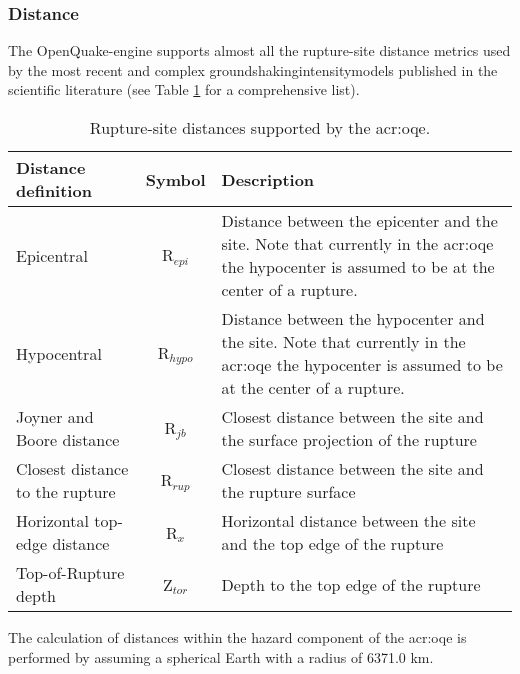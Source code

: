 \subsubsection{Distance}
%
The OpenQuake-engine supports almost all the rupture-site 
distance metrics used by the most recent and complex 
\glspl{groundshakingintensitymodel} published in the scientific 
literature (see Table \ref{tab:distances} for a comprehensive list).
\begin{table}[!t]
\centering
\caption{Rupture-site distances supported by the \gls{acr:oqe}.}
\begin{tabular}{|p{4.5cm}cp{7.5cm}|}
\hline
\rowcolor{anti-flashwhite}
\bf{Distance definition} & \bf{Symbol} & \bf{Description} \\
\hline 
Epicentral & R$_{epi}$ & Distance between the epicenter and the site. 
                         Note that currently in the \gls{acr:oqe} the 
                         hypocenter is assumed to be at the center of 
                         a rupture.\\
Hypocentral & R$_{hypo}$ & Distance between the hypocenter and the site. 
                           Note that currently in the \gls{acr:oqe} the 
                           hypocenter is assumed to be at the center of 
                           a rupture.\\
Joyner and Boore distance & R$_{jb}$ & Closest distance between the site and 
                                       the surface projection of the rupture \\
Closest distance to the rupture & R$_{rup}$ & Closest distance between 
                                              the site and the rupture 
                                              surface \\
Horizontal top-edge distance & R$_{x}$ & Horizontal distance between the site 
                                         and the top edge of the rupture \\
Top-of-Rupture depth & Z$_{tor}$ & Depth to the top edge of the rupture \\
\hline
\end{tabular}
\label{tab:distances}
\end{table}
The calculation of distances within the hazard component of the \gls{acr:oqe} 
is performed by assuming a spherical Earth with a radius of 6371.0 km. 

